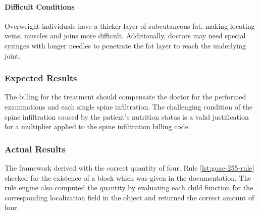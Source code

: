 \paragraph{Difficult Conditions}
Overweight individuals have a thicker layer of subcutaneous fat, making locating veins, muscles and joins more difficult.
Additionally, doctors may need special syringes with longer needles to penetrate the fat layer to reach the underlying joint.


\subsubsection{Expected Results}
The billing for the treatment should compensate the doctor for the performed examinations and each single spine infiltration.
The challenging condition of the spine infiltration caused by the patient's nutrition status is a valid justification for a multiplier applied to the spine infiltration billing code.


\subsubsection{Actual Results}

The framework derived  with the correct quantity of four.
Rule \ref{lst:goae-255-rule} checked for the existence of a  block which was given in the documentation.
The rule engine also computed the quantity by evaluating each child function for the corresponding localization field in the  object and returned the correct amount of four.







